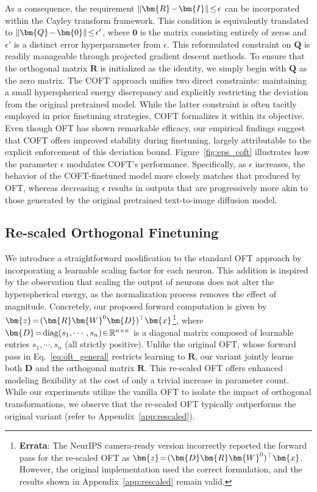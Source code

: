 As a consequence, the requirement $\thickmuskip=2mu \medmuskip=2mu\|\bm{R}-\bm{I}\|\leq\epsilon$ can be incorporated within the Cayley transform framework. This condition is equivalently translated to $\thickmuskip=2mu \medmuskip=2mu \|\bm{Q}-\bm{0}\|\leq\epsilon'$, where $\bm{0}$ is the matrix consisting entirely of zeros and $\epsilon'$ is a distinct error hyperparameter from $\epsilon$. This reformulated constraint on $\bm{Q}$ is readily manageable through projected gradient descent methods. To ensure that the orthogonal matrix $\bm{R}$ is initialized as the identity, we simply begin with $\bm{Q}$ as the zero matrix. The COFT approach unifies two direct constraints: maintaining a small hyperspherical energy discrepancy and explicitly restricting the deviation from the original pretrained model. While the latter constraint is often tacitly employed in prior finetuning strategies, COFT formalizes it within its objective. Even though OFT has shown remarkable efficacy, our empirical findings suggest that COFT offers improved stability during finetuning, largely attributable to the explicit enforcement of this deviation bound. Figure~\ref{fig:eps_coft} illustrates how the parameter $\epsilon$ modulates COFT's performance. Specifically, as $\epsilon$ increases, the behavior of the COFT-finetuned model more closely matches that produced by OFT, whereas decreasing $\epsilon$ results in outputs that are progressively more akin to those generated by the original pretrained text-to-image diffusion model.

\subsection{Re-scaled Orthogonal Finetuning}

We introduce a straightforward modification to the standard OFT approach by incorporating a learnable scaling factor for each neuron. This addition is inspired by the observation that scaling the output of neurons does not alter the hyperspherical energy, as the normalization process removes the effect of magnitude. Concretely, our proposed forward computation is given by $\thickmuskip=2mu \medmuskip=2mu\bm{z}=(\bm{R}\bm{W}^0\bm{D})^\top\bm{x}$\footnote{\textbf{Errata}: The NeurIPS camera-ready version incorrectly reported the forward pass for the re-scaled OFT as $\thickmuskip=2mu \medmuskip=2mu\bm{z}=(\bm{D}\bm{R}\bm{W}^0)^\top\bm{x}$. However, the original implementation used the correct formulation, and the results shown in Appendix~\ref{app:rescaled} remain valid.}, where $\thickmuskip=2mu \medmuskip=2mu \bm{D}=\text{diag}(s_1,\cdots,s_n)\in\mathbb{R}^{n\times n}$ is a diagonal matrix composed of learnable entries $s_1,\cdots,s_n$ (all strictly positive). Unlike the original OFT, whose forward pass in Eq.~\eqref{eq:oft_general} restricts learning to $\bm{R}$, our variant jointly learns both $\bm{D}$ and the orthogonal matrix $\bm{R}$. This re-scaled OFT offers enhanced modeling flexibility at the cost of only a trivial increase in parameter count. While our experiments utilize the vanilla OFT to isolate the impact of orthogonal transformations, we observe that the re-scaled OFT typically outperforms the original variant (refer to Appendix~\ref{app:rescaled}).

